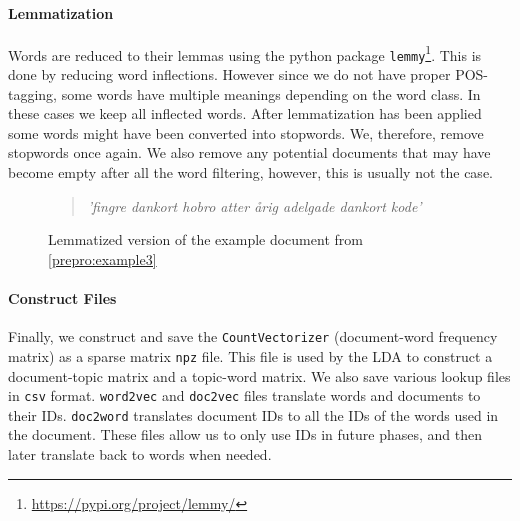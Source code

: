 \paragraph{Lemmatization}
Words are reduced to their lemmas using the python package \texttt{lemmy}\footnote{\url{https://pypi.org/project/lemmy/}}. 
This is done by reducing word inflections.
However since we do not have proper POS-tagging, some words have multiple meanings depending on the word class.
In these cases we keep all inflected words.
After lemmatization has been applied some words might have been converted into stopwords.
We, therefore, remove stopwords once again.
We also remove any potential documents that may have become empty after all the word filtering, however, this is usually not the case.
\begin{figure}[h]
	\begin{framed}
		\begin{quote}
			\textit{
				'fingre dankort hobro atter årig adelgade dankort kode'
			}
		\end{quote}
	\end{framed}
	\caption{Lemmatized version of the example document from \autoref{prepro:example3}}
	\label{prepro:example5}
\end{figure}

\paragraph{Construct Files}
Finally, we construct and save the \texttt{CountVectorizer} (document-word frequency matrix) as a sparse matrix \texttt{npz} file.
This file is used by the LDA to construct a document-topic matrix and a topic-word matrix.
We also save various lookup files in \texttt{csv} format.
\texttt{word2vec} and \texttt{doc2vec} files translate words and documents to their IDs.
\texttt{doc2word} translates document IDs to all the IDs of the words used in the document.
These files allow us to only use IDs in future phases, and then later translate back to words when needed.

